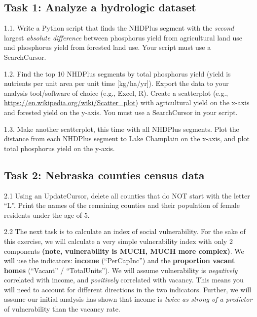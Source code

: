 \documentclass[]{article}
\begin{document}
\hypertarget{task-1-analyze-a-hydrologic-dataset}{%
\subsection{Task 1: Analyze a hydrologic
dataset}\label{task-1-analyze-a-hydrologic-dataset}}

1.1. Write a Python script that finds the NHDPlus segment with the
\emph{second} largest \emph{absolute difference} between phosphorus
yield from agricultural land use and phosphorus yield from forested land
use. Your script must use a SearchCursor.

1.2. Find the top 10 NHDPlus segments by total phosphorus yield (yield
is nutrients per unit area per unit time {[}kg/ha/yr{]}). Export the
data to your analysis tool/software of choice (e.g., Excel, R). Create a
scatterplot (e.g., \url{https://en.wikipedia.org/wiki/Scatter_plot})
with agricultural yield on the x-axis and forested yield on the y-axis.
You must use a SearchCursor in your script.

1.3. Make another scatterplot, this time with all NHDPlus segments. Plot
the distance from each NHDPlus segment to Lake Champlain on the x-axis,
and plot total phosphorus yield on the y-axis.

\hypertarget{task-2-nebraska-counties-census-data}{%
\subsection{Task 2: Nebraska counties census
data}\label{task-2-nebraska-counties-census-data}}

2.1 Using an UpdateCursor, delete all counties that do NOT start with
the letter ``L''. Print the names of the remaining counties and their
population of female residents under the age of 5.

2.2 The next task is to calculate an index of social vulnerability. For
the sake of this exercise, we will calculate a very simple vulnerability
index with only 2 components \textbf{(note, vulnerability is MUCH, MUCH
more complex)}. We will use the indicators: \textbf{income}
(``PerCapInc'') and the \textbf{proportion vacant homes} (``Vacant'' /
``TotalUnits''). We will assume vulnerability is \emph{negatively}
correlated with income, and \emph{positively} correlated with vacancy.
This means you will need to account for different directions in the two
indicators. Further, we will assume our initial analysis has shown that
income is \emph{twice as strong of a predictor} of vulnerability than
the vacancy rate.
\end{document}

